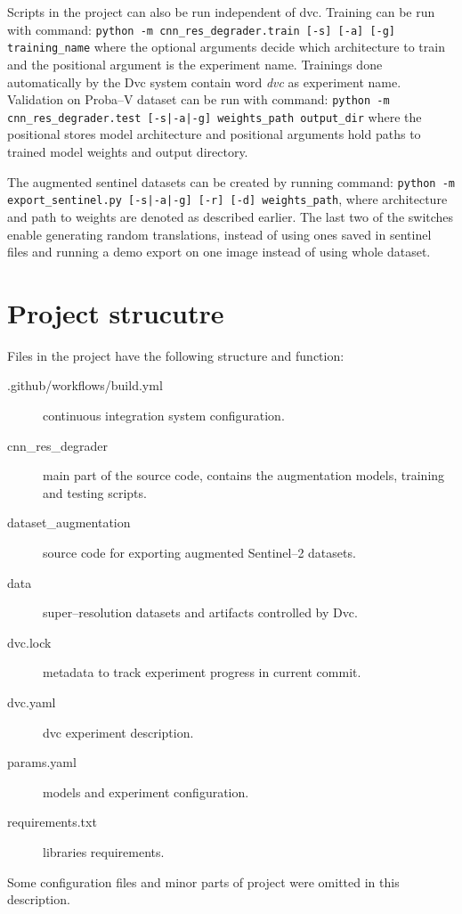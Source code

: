 Scripts in the project can also be run independent of dvc.
Training can be run with command: \texttt{python -m cnn_res_degrader.train [-s] [-a] [-g] training_name} where the optional arguments decide which architecture to train and the positional argument is the experiment name.
Trainings done automatically by the Dvc system contain word \textit{dvc} as experiment name.
Validation on Proba--V dataset can be run with command: \texttt{python -m cnn_res_degrader.test [-s|-a|-g] weights_path output_dir} where the positional stores model architecture and positional arguments hold paths to trained model weights and output directory.

The augmented sentinel datasets can be created by running command: \texttt{python -m export_sentinel.py [-s|-a|-g] [-r] [-d] weights_path}, where architecture and path to weights are denoted as described earlier.
The last two of the switches enable generating random translations, instead of using ones saved in sentinel files and running a demo export on one image instead of using whole dataset.

\section{Project strucutre}
Files in the project have the following structure and function:
\begin{description}
	\item[.github/workflows/build.yml] continuous integration system configuration.
	\item[cnn\_res\_degrader] main part of the source code, contains the augmentation models, training and testing scripts.
	\item[dataset\_augmentation] source code for exporting augmented Sentinel--2 datasets.
	\item[data] super--resolution datasets and artifacts controlled by Dvc.
	\item[dvc.lock] metadata to track experiment progress in current commit.
	\item[dvc.yaml] dvc experiment description.
	\item[params.yaml] models and experiment configuration.
	\item[requirements.txt] libraries requirements.
\end{description}
Some configuration files and minor parts of project were omitted in this description.

